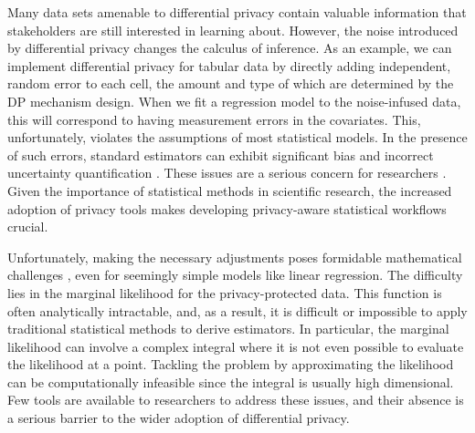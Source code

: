 Many data sets amenable to differential privacy contain
valuable information that stakeholders are still interested in
learning about. However, the noise introduced by differential privacy
changes the calculus of inference. As an example,
we can implement differential privacy for tabular data by directly
adding independent, random error to each cell, the amount and type of which are determined by the DP mechanism design.
When we fit a regression model to the noise-infused data,
this will correspond to having measurement errors
in the covariates. This, unfortunately, violates the assumptions of most statistical models.
In the presence of such errors, standard estimators can exhibit significant bias and incorrect uncertainty quantification
\citep{Gong2022, karwa2015private, Wang2018}.
These issues are a serious concern for researchers \citep{SantosLozada2020, Kenny2021, Winkler2021}.
Given the importance of statistical methods in scientific research,
the increased adoption of privacy tools makes developing privacy-aware statistical workflows crucial.

Unfortunately, making the necessary adjustments poses formidable mathematical
challenges \citep{NIPS2010_sherry}, even for seemingly simple models like linear regression.
The difficulty lies in the marginal likelihood for the privacy-protected data.
This function is often analytically intractable, and, as a result,
it is difficult or impossible to apply traditional statistical methods
to derive estimators. In particular, the marginal likelihood can involve a complex
integral where it is not even possible to evaluate the likelihood
at a point. Tackling the problem by approximating the likelihood can be computationally
infeasible since the integral is usually high dimensional.
Few tools are available to researchers to address these issues,
and their absence is a serious barrier to the wider adoption
of differential privacy.

